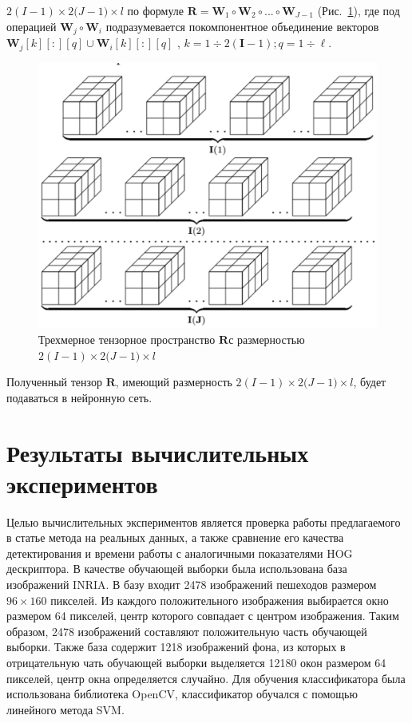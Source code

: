 \documentclass[12pt,twoside]{article}
\begin{document}
${2(I-1)}\times {2(J-1})\times {l}$ по формуле 
$\textbf{R}=\textbf{W}_1 \circ \textbf{W}_2 \circ ... \circ \textbf{W}_{J-1}$
(Рис.~\ref{ris:4}), где под операцией $\textbf{W}_j \circ \textbf{W}_i$ подразумевается покомпонентное объединение векторов $\textbf{W}_{j}[k][:][q] \cup \textbf{W}_i[k][:][q]$ ,  $k=1\div 2(\textbf{I}-1); q=1\div \ell$.
\begin{center}
	\begin{figure}[H]
		\includegraphics[width=0.6\linewidth]{4}
		\caption{Трехмерное тензорное пространство $\textbf{R}$с размерностью  ${2(I-1)}\times {2(J-1})\times {l}$}
		\label{ris:4}
	\end{figure}
	
\end{center}
Полученный тензор $\textbf{R}$, имеющий размерность  ${2(I-1)}\times {2(J-1})\times {l}$, будет подаваться в нейронную сеть. 


\section{Результаты вычислительных экспериментов}
Целью вычислительных экспериментов является проверка работы предлагаемого в статье метода на реальных данных, а также сравнение его качества детектирования и времени работы с аналогичными показателями HOG дескриптора.
В качестве обучающей выборки была использована база изображений INRIA. В базу входит 2478 изображений пешеходов размером $96 \times 160$ пикселей.
Из каждого положительного изображения выбирается окно размером 64 пикселей, центр которого совпадает с центром изображения. Таким образом, 2478 изображений составляют положительную часть обучающей выборки.
Также база содержит 1218 изображений фона, из которых в отрицательную чать обучающей выборки выделяется 12180 окон размером 64 пикселей, центр окна определяется случайно.
Для обучения классификатора была использована библиотека OpenCV, классификатор обучался с помощью линейного метода SVM.
\end{document}
